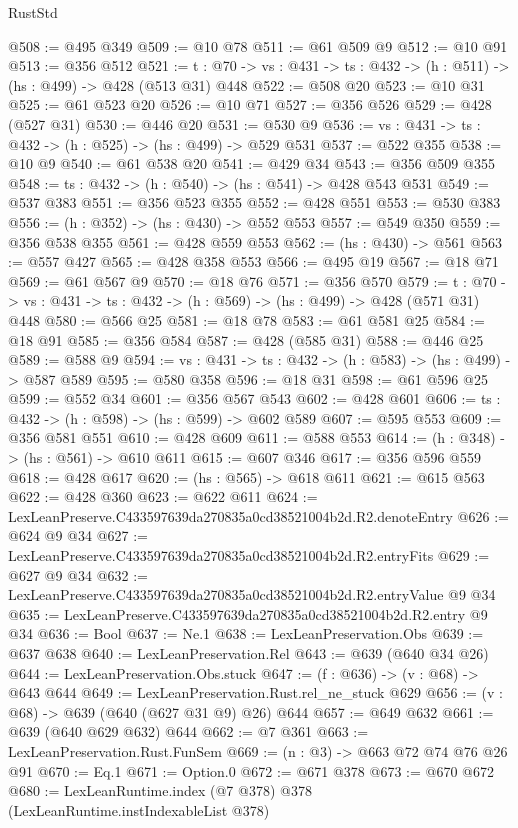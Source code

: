 \begin{lexlean}{RustStd}
\begin{coremodule}
@508 := @495 @349
@509 := @10 @78
@511 := @61 @509 @9
@512 := @10 @91
@513 := @356 @512
@521 := {t : @70} -> {vs : @431} -> {ts : @432} -> (h : @511) -> (hs : @499) -> @428 (@513 @31) @448
@522 := @508 @20
@523 := @10 @31
@525 := @61 @523 @20
@526 := @10 @71
@527 := @356 @526
@529 := @428 (@527 @31)
@530 := @446 @20
@531 := @530 @9
@536 := {vs : @431} -> {ts : @432} -> (h : @525) -> (hs : @499) -> @529 @531
@537 := @522 @355
@538 := @10 @9
@540 := @61 @538 @20
@541 := @429 @34
@543 := @356 @509 @355
@548 := {ts : @432} -> (h : @540) -> (hs : @541) -> @428 @543 @531
@549 := @537 @383
@551 := @356 @523 @355
@552 := @428 @551
@553 := @530 @383
@556 := (h : @352) -> (hs : @430) -> @552 @553
@557 := @549 @350
@559 := @356 @538 @355
@561 := @428 @559 @553
@562 := (hs : @430) -> @561
@563 := @557 @427
@565 := @428 @358 @553
@566 := @495 @19
@567 := @18 @71
@569 := @61 @567 @9
@570 := @18 @76
@571 := @356 @570
@579 := {t : @70} -> {vs : @431} -> {ts : @432} -> (h : @569) -> (hs : @499) -> @428 (@571 @31) @448
@580 := @566 @25
@581 := @18 @78
@583 := @61 @581 @25
@584 := @18 @91
@585 := @356 @584
@587 := @428 (@585 @31)
@588 := @446 @25
@589 := @588 @9
@594 := {vs : @431} -> {ts : @432} -> (h : @583) -> (hs : @499) -> @587 @589
@595 := @580 @358
@596 := @18 @31
@598 := @61 @596 @25
@599 := @552 @34
@601 := @356 @567 @543
@602 := @428 @601
@606 := {ts : @432} -> (h : @598) -> (hs : @599) -> @602 @589
@607 := @595 @553
@609 := @356 @581 @551
@610 := @428 @609
@611 := @588 @553
@614 := (h : @348) -> (hs : @561) -> @610 @611
@615 := @607 @346
@617 := @356 @596 @559
@618 := @428 @617
@620 := (hs : @565) -> @618 @611
@621 := @615 @563
@622 := @428 @360
@623 := @622 @611
@624 := LexLeanPreserve.C433597639da270835a0cd38521004b2d.R2.denoteEntry
@626 := @624 @9 @34
@627 := LexLeanPreserve.C433597639da270835a0cd38521004b2d.R2.entryFits
@629 := @627 @9 @34
@632 := LexLeanPreserve.C433597639da270835a0cd38521004b2d.R2.entryValue @9 @34
@635 := LexLeanPreserve.C433597639da270835a0cd38521004b2d.R2.entry @9 @34
@636 := Bool
@637 := Ne.{1}
@638 := LexLeanPreservation.Obs
@639 := @637 @638
@640 := LexLeanPreservation.Rel
@643 := @639 (@640 @34 @26)
@644 := LexLeanPreservation.Obs.stuck
@647 := (f : @636) -> (v : @68) -> @643 @644
@649 := LexLeanPreservation.Rust.rel_ne_stuck @629
@656 := (v : @68) -> @639 (@640 (@627 @31 @9) @26) @644
@657 := @649 @632
@661 := @639 (@640 @629 @632) @644
@662 := @7 @361
@663 := LexLeanPreservation.Rust.FunSem
@669 := (n : @3) -> @663 @72 @74 @76 @26 @91
@670 := Eq.{1}
@671 := Option.{0}
@672 := @671 @378
@673 := @670 @672
@680 := LexLeanRuntime.index (@7 @378) @378 (LexLeanRuntime.instIndexableList @378)

\end{coremodule}
\end{lexlean}
